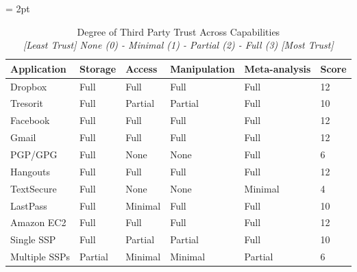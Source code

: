 \begin{table}[!hb]
  \footnotesize
  \centering
  \tabulinesep = 2pt
  \begin{tabu} to \textwidth
    { | X[1,c,m]
      | X[1,c,m]
      | X[1,c,m]
      | X[1,c,m]
      | X[1,c,m]
      | X[0.5,c,m]
      | }
    \hline
    \textbf{Application}
    & \textbf{Storage}
    & \textbf{Access}
    & \textbf{Manipulation}
    & \textbf{Meta-analysis}
    & \textbf{Score}
    \\ \hline
    Dropbox
    & Full
    & Full
    & Full
    & Full
    & 12
    \\ \hline
    Tresorit
    & Full
    & Partial
    & Partial
    & Full
    & 10
    \\ \hline
    Facebook
    & Full
    & Full
    & Full
    & Full
    & 12
    \\ \hline
    Gmail
    & Full
    & Full
    & Full
    & Full
    & 12
    \\ \hline
    PGP/GPG
    & Full
    & None
    & None
    & Full
    & 6
    \\ \hline
    Hangouts
    & Full
    & Full
    & Full
    & Full
    & 12
    \\ \hline
    TextSecure
    & Full
    & None
    & None
    & Minimal
    & 4
    \\ \hline 
    LastPass
    & Full
    & Minimal
    & Full
    & Full
    & 10
    \\ \hline 
    Amazon EC2
    & Full
    & Full
    & Full
    & Full
    & 12
    \\ \hline 
    Single SSP
    & Full
    & Partial
    & Partial
    & Full
    & 10
    \\ \hline 
    Multiple SSPs
    & Partial
    & Minimal
    & Minimal
    & Partial
    & 6
    \\ \hline 
 \end{tabu}
  \caption[Degree of Third Party Trust Across Capabilities]{
    Degree of Third Party Trust Across Capabilities\\
    \textit{[Least Trust] None (0) - Minimal (1) - Partial (2) - Full (3) [Most Trust]}
  }
  \label{tab:trust:app:cap}
\end{table}

